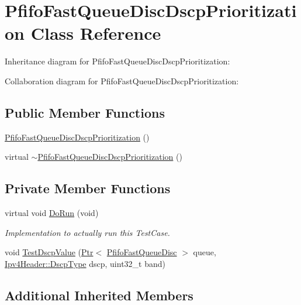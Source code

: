 \hypertarget{classPfifoFastQueueDiscDscpPrioritization}{}\section{Pfifo\+Fast\+Queue\+Disc\+Dscp\+Prioritization Class Reference}
\label{classPfifoFastQueueDiscDscpPrioritization}


Inheritance diagram for Pfifo\+Fast\+Queue\+Disc\+Dscp\+Prioritization\+:


Collaboration diagram for Pfifo\+Fast\+Queue\+Disc\+Dscp\+Prioritization\+:
\subsection*{Public Member Functions}
\begin{DoxyCompactItemize}
\item 
\hyperlink{classPfifoFastQueueDiscDscpPrioritization_a0068e724d6b5aaca64f0a8e74d5a0588}{Pfifo\+Fast\+Queue\+Disc\+Dscp\+Prioritization} ()
\item 
virtual \hyperlink{classPfifoFastQueueDiscDscpPrioritization_a78dc86c044d9a54c228d6404715fadf5}{$\sim$\+Pfifo\+Fast\+Queue\+Disc\+Dscp\+Prioritization} ()
\end{DoxyCompactItemize}
\subsection*{Private Member Functions}
\begin{DoxyCompactItemize}
\item 
virtual void \hyperlink{classPfifoFastQueueDiscDscpPrioritization_a5ed7e1adc3f38e252cd274954e4806ca}{Do\+Run} (void)
\begin{DoxyCompactList}\small\item\em Implementation to actually run this Test\+Case. \end{DoxyCompactList}\item 
void \hyperlink{classPfifoFastQueueDiscDscpPrioritization_a153fd90bcf84e06728ad582d63544627}{Test\+Dscp\+Value} (\hyperlink{classns3_1_1Ptr}{Ptr}$<$ \hyperlink{classns3_1_1PfifoFastQueueDisc}{Pfifo\+Fast\+Queue\+Disc} $>$ queue, \hyperlink{classns3_1_1Ipv4Header_aaa17802e7732a689311b72d48d1a3450}{Ipv4\+Header\+::\+Dscp\+Type} dscp, uint32\+\_\+t band)
\end{DoxyCompactItemize}
\subsection*{Additional Inherited Members}


